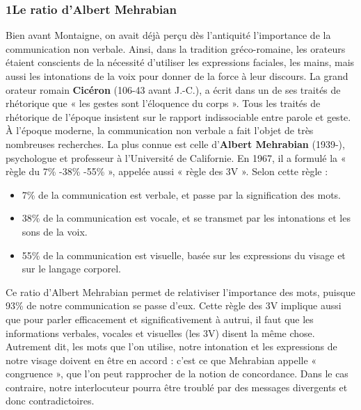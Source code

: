 \subsubsection*{1\quad Le ratio d’Albert Mehrabian}
Bien avant Montaigne, on avait déjà perçu dès l’antiquité l’importance de la communication non verbale. Ainsi, dans la tradition gréco-romaine, les orateurs étaient conscients de la nécessité d’utiliser les expressions faciales, les mains, mais aussi les intonations de la voix pour donner de la force à leur discours. La grand orateur romain \textbf{Cicéron} (106-43 avant J.-C.), a écrit dans un de ses traités de rhétorique que « les gestes sont l’éloquence du corps ». Tous les traités de rhétorique de l’époque insistent sur le rapport indissociable entre parole et geste. À l’époque moderne, la communication non verbale a fait l’objet de très nombreuses recherches. La plus connue est celle d’\textbf{Albert Mehrabian} (1939-), psychologue et professeur à l’Université de Californie. En 1967, il a formulé la « règle du 7\% -38\% -55\% », appelée aussi « règle des 3V ». Selon cette règle :
\begin{itemize}
\item 7\% de la communication est verbale, et passe par la signification des mots.
\item 38\% de la communication est vocale, et se transmet par les intonations et les sons de la voix.
\item 55\% de la communication est visuelle, basée sur les expressions du visage et sur le langage corporel.
\end{itemize}
Ce ratio d’Albert Mehrabian permet de relativiser l’importance des mots, puisque 93\% de notre communication se passe d’eux. Cette règle des 3V implique aussi que pour parler efficacement et significativement à autrui, il faut que les informations verbales, vocales et visuelles (les 3V) disent la même chose. Autrement dit, les mots que l’on utilise, notre intonation et les expressions de notre visage doivent en être en accord : c’est ce que Mehrabian appelle « congruence », que l’on peut rapprocher de la notion de concordance. Dans le cas contraire, notre interlocuteur pourra être troublé par des messages divergents et donc contradictoires.
